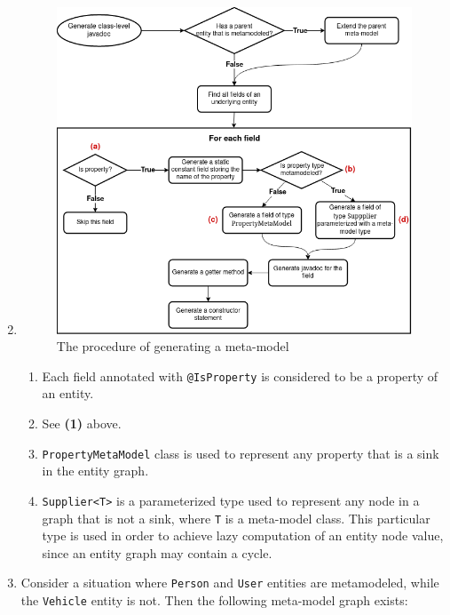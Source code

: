 \begin{enumerate}[label={\textbf{(\arabic*)*}}]
\setcounter{enumi}{1}
    \item \;
        \begin{figure}[H]\centering
            \includegraphics[scale=0.55]{images/meta-model-algorithm.drawio.png}
            \caption{The procedure of generating a meta-model}\label{fig:meta-model_algorithm}
        \end{figure}

        \begin{enumerate}[label={\textbf{(\alph*)}}]
            \item Each field annotated with \texttt{@IsProperty} is considered to be a property of an entity.
            \item See \textbf{(1)} above.
            \item \texttt{PropertyMetaModel} class is used to represent any property that is a sink in the entity graph.
            \item \texttt{Supplier<T>} is a parameterized type used to represent any node in a graph that is not a sink, where \texttt{T} is a meta-model class. This particular type is used in order to achieve lazy computation of an entity node value, since an entity graph may contain a cycle.
        \end{enumerate}

    \addtocounter{enumi}{1}
    \item Consider a situation where \texttt{Person} and \texttt{User} entities are metamodeled, while the \texttt{Vehicle} entity is not. Then the following meta-model graph exists:



\end{enumerate}

